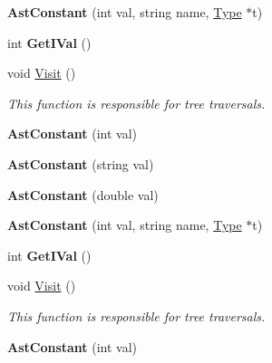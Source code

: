 \begin{DoxyCompactItemize}
\item 
\hypertarget{classAstConstant_a9ceaff3b1de813268a88d7fded0aeb0c}{{\bfseries Ast\-Constant} (int val, string name, \hyperlink{classType}{Type} $\ast$t)}\label{classAstConstant_a9ceaff3b1de813268a88d7fded0aeb0c}

\item 
\hypertarget{classAstConstant_af9d81586158302f949f98f21bf4e8f5d}{int {\bfseries Get\-I\-Val} ()}\label{classAstConstant_af9d81586158302f949f98f21bf4e8f5d}

\item 
void \hyperlink{classAstConstant_ac13b7246f9d646a5ff00efee4c39bc6b}{Visit} ()
\begin{DoxyCompactList}\small\item\em This function is responsible for tree traversals. \end{DoxyCompactList}\item 
\hypertarget{classAstConstant_ab3d7bb141b6d2650498569fa7742237f}{{\bfseries Ast\-Constant} (int val)}\label{classAstConstant_ab3d7bb141b6d2650498569fa7742237f}

\item 
\hypertarget{classAstConstant_a071adbaa9ea9ad30cde38d68b4182cd9}{{\bfseries Ast\-Constant} (string val)}\label{classAstConstant_a071adbaa9ea9ad30cde38d68b4182cd9}

\item 
\hypertarget{classAstConstant_aef9142c2750c7ad8e83183c7b8ade0e8}{{\bfseries Ast\-Constant} (double val)}\label{classAstConstant_aef9142c2750c7ad8e83183c7b8ade0e8}

\item 
\hypertarget{classAstConstant_a9ceaff3b1de813268a88d7fded0aeb0c}{{\bfseries Ast\-Constant} (int val, string name, \hyperlink{classType}{Type} $\ast$t)}\label{classAstConstant_a9ceaff3b1de813268a88d7fded0aeb0c}

\item 
\hypertarget{classAstConstant_af9d81586158302f949f98f21bf4e8f5d}{int {\bfseries Get\-I\-Val} ()}\label{classAstConstant_af9d81586158302f949f98f21bf4e8f5d}

\item 
void \hyperlink{classAstConstant_ac13b7246f9d646a5ff00efee4c39bc6b}{Visit} ()
\begin{DoxyCompactList}\small\item\em This function is responsible for tree traversals. \end{DoxyCompactList}\item 
\hypertarget{classAstConstant_ab3d7bb141b6d2650498569fa7742237f}{{\bfseries Ast\-Constant} (int val)}\label{classAstConstant_ab3d7bb141b6d2650498569fa7742237f}


\end{DoxyCompactItemize}
